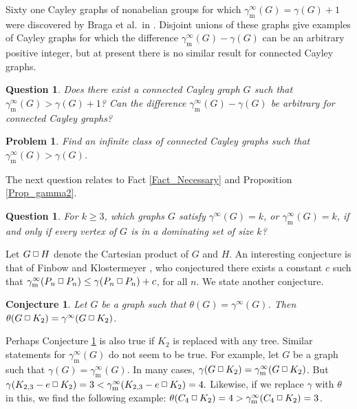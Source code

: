 \documentclass[12pt]{article}%
\newtheorem{conjecture}[theorem]{Conjecture}
\newtheorem{problem}[theorem]{Problem}
\newtheorem{question}[theorem]{Question}
\providecommand{\boksie}{\ensuremath{\mathbin{\raisebox{0.3mm}{$\scriptstyle\square$}}}}
\begin{document}
Sixty one Cayley graphs of nonabelian groups for which $\gamma_{\mathrm{m}%
}^{\infty}(G)=\gamma(G)+1$ were discovered by Braga et al.~in \cite{BdSL}.
Disjoint unions of these graphs give examples of Cayley graphs for which the
difference $\gamma_{\mathrm{m}}^{\infty}(G)-\gamma(G)$ can be an arbitrary
positive integer, but at present there is no similar result for connected
Cayley graphs.

\begin{question}
Does there exist a connected Cayley graph $G$ such that $\gamma_{\mathrm{m}%
}^{\infty}(G)>\gamma(G)+1$? Can the difference $\gamma_{\mathrm{m}}^{\infty
}(G)-\gamma(G)$ be arbitrary for connected Cayley graphs?
\end{question}

\begin{problem}
Find an infinite class of connected Cayley graphs such that $\gamma
_{\mathrm{m}}^{\infty}(G)>\gamma(G)$.
\end{problem}

The next question relates to Fact \ref{Fact_Necessary} and Proposition
\ref{Prop_gamma2}.

\begin{question}
For $k\geq3$, which graphs $G$ satisfy $\gamma^{\infty}(G)=k$, or
$\gamma_{\mathrm{m}}^{\infty}(G)=k$, if and only if every vertex of $G$ is in
a dominating set of size $k$?
\end{question}

Let $G\boksie H$ denote the Cartesian product of $G$ and $H$. An interesting
conjecture is that of Finbow and Klostermeyer \cite{KMSurvey}, who conjectured
there exists a constant $c$ such that $\gamma_{\mathrm{m}}^{\infty}%
(P_{n}\boksie P_{n})\leq\gamma(P_{n}\boksie
P_{n})+c$, for all $n$. We state another conjecture.

\begin{conjecture}
\label{c1} Let $G$ be a graph such that $\theta(G)=\gamma^{\infty}(G)$. Then
$\theta(G \boksie K_{2})=\gamma^{\infty}(G \boksie K_{2})$.
\end{conjecture}

Perhaps Conjecture \ref{c1} is also true if $K_{2}$ is replaced with any tree.
Similar statements for $\gamma_{\mathrm{m}}^{\infty}(G)$ do not seem to be
true. For example, let $G$ be a graph such that $\gamma(G)=\gamma_{\mathrm{m}%
}^{\infty}(G)$. In many cases, $\gamma(G\boksie K_{2})=\gamma_{\mathrm{m}%
}^{\infty}(G\boksie K_{2})$. But $\gamma(K_{2,3}-e\boksie K_{2})=3<\gamma
_{\mathrm{m}}^{\infty}(K_{2,3}-e\boksie K_{2})=4.$ Likewise, if we replace
$\gamma$ with $\theta$ in this, we find the following example: $\theta
(C_{4}\boksie K_{2})=4>\gamma_{\mathrm{m}}^{\infty}(C_{4}\boksie K_{2})=3$.
\end{document}
